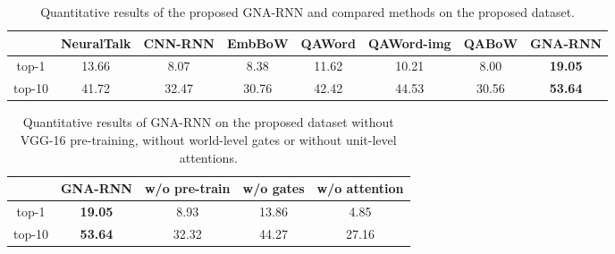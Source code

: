 \setlength{\tabcolsep}{2pt}
\begin{table}[t]
	\begin{center}
		\begin{tabular}{c|c|cc|ccc|c}
			\hline
			
			\hline
			\cline{2-8}
			& NeuralTalk & CNN-RNN & EmbBoW & QAWord & QAWord-img & QABoW & GNA-RNN\\
			\hline
			
			\hline\noalign{\smallskip}\hline
			
			\hline
			top-1 		& 13.66 & 8.07 & 8.38 & 11.62 & 10.21  & 8.00 & \textbf{19.05} \\
			\hline
			top-10  	& 41.72 & 32.47 & 30.76 & 42.42 & 44.53 & 30.56 & \textbf{53.64}  \\
			\hline
			
			\hline
		\end{tabular}
	\end{center}
	\vspace{-7pt}
	\caption{Quantitative results of the proposed GNA-RNN and compared methods on the proposed dataset.}
	\label{tab:results}
	\vspace{-5pt}
\end{table}

\setlength{\tabcolsep}{2pt}
\begin{table}[t]
	\begin{center}
		\begin{tabular}{c|c|c|c|c}
			\hline
			
			\hline
			\cline{2-4}
			& GNA-RNN & w/o pre-train & w/o gates & w/o attention \\
			\hline
			
			\hline\noalign{\smallskip}\hline
			
			\hline
			top-1 		& \textbf{19.05} &8.93 & 13.86 & 4.85 \\
			\hline
			top-10  	& \textbf{53.64} &32.32 & 44.27 & 27.16 \\
			\hline
			
			\hline
		\end{tabular}
	\end{center}
	\caption{Quantitative results of GNA-RNN on the proposed dataset without VGG-16 pre-training, without world-level gates or without unit-level attentions.}
	\label{tab:ablation}
	\vspace{-5pt}
\end{table}


